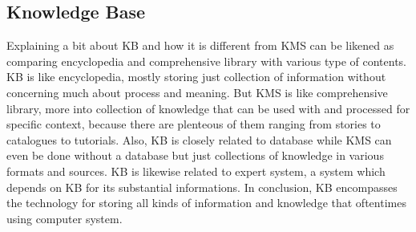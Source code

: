 \subsection{Knowledge Base}

Explaining a bit about \ac{KB} and how it is different from \ac{KMS} can be likened as comparing encyclopedia and comprehensive library with various type of contents.
\ac{KB} is like encyclopedia, mostly storing just collection of information without concerning much about process and meaning.
But \ac{KMS} is like comprehensive library, more into collection of knowledge that can be used with and processed for specific context, because there are plenteous of them ranging from stories to catalogues to tutorials.
Also, \ac{KB} is closely related to database while \ac{KMS} can even be done without a database but just collections of knowledge in various formats and sources.
\ac{KB} is likewise related to expert system, a system which depends on \ac{KB} for its substantial informations.
In conclusion, \ac{KB} encompasses the technology for storing all kinds of information and knowledge that oftentimes using computer system.
